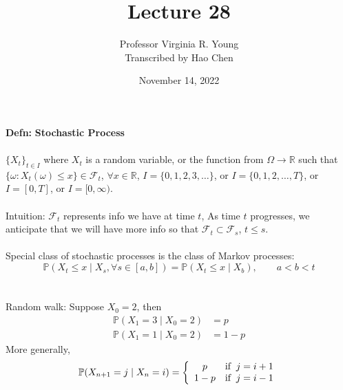 \documentclass[a4paper]{article}
\title{Lecture 28}
\author{Professor Virginia R. Young\\ \small{Transcribed by Hao Chen}}
\date{November 14, 2022}
\newcommand{\n}{\hfill\break}
\newcommand{\defn}[1]{\par\noindent\settowidth{\hangindent}{\textbf{Defn: }}\textbf{Defn: }#1\n}
\newcommand{\reals}{\mathbb{R}}
\newcommand{\R}{\reals}
\newcommand{\F}{\mathcal F}
\newcommand{\Prob}{\mathbb{P}}
\renewcommand{\P}{\Prob}
\begin{document}
\maketitle

\defn{
    \textbf{Stochastic Process}
    \\\\
    $\{X_t\}_{t\in I}$ where $X_t$ is a random variable, or the function from $\Omega\rightarrow\R$ such that $\{\omega:X_t(\omega)\leq x\}\in\F_t$, $\forall x\in \R$, $I=\{0,1,2,3,\dots\}$, or $I=\{0,1,2,\dots,T\}$, or $I=[0,T]$, or $I=[0,\infty)$.
    \\\\
    Intuition: $\F_t$ represents info we have at time $t$, As time $t$ progresses, we anticipate that we will have more info so that $\F_t\subset\F_s$, $t\leq s$.
    \\\\
    Special class of stochastic processes is the class of Markov processes:
    \[\P(X_t\leq x\mid X_s, \forall s\in[a,b])=\P(X_t\leq x\mid X_b), \qquad a<b<t\]
    \\\\
    Random walk: Suppose $X_0=2$, then 
    \begin{align*}
        \P(X_1=3\mid X_0=2)&=p \\
        \P(X_1=1\mid X_0=2)&=1-p
    \end{align*}
    More generally,
    \[\P(X_{n+1}=j\mid X_n=i)=\left\{\begin{array}{cc}
        p & \text{if\;\;}j=i+1 \\
        1-p & \text{if\;\;}j=i-1
    \end{array}\right.\]
}
\end{document}
